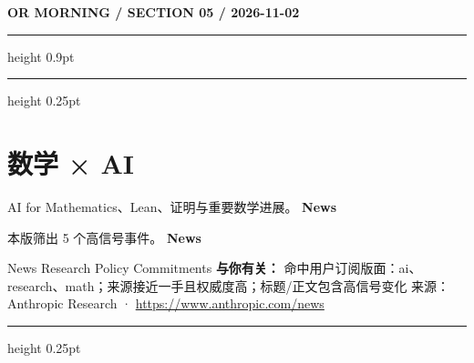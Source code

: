 \documentclass[10.5pt]{ctexart}
\begin{document}
\newpage
{\small\bfseries OR MORNING / SECTION 05 / 2026-11-02}
\vspace{2mm}
\hrule height 0.9pt
\vspace{1.5mm}
\hrule height 0.25pt
\vspace{4mm}
\section*{数学 × AI}
{\color{ormuted} AI for Mathematics、Lean、证明与重要数学进展。}
\vspace{2mm}
{\LARGE\bfseries News}\par
\vspace{1mm}
{\color{ormuted} 本版筛出 5 个高信号事件。}
\vspace{3mm}
{\Large\bfseries News}\par
News Research Policy Commitments
\textbf{与你有关：} 命中用户订阅版面：ai、research、math；来源接近一手且权威度高；标题/正文包含高信号变化
{\footnotesize\color{ormuted} 来源：Anthropic Research · \url{https://www.anthropic.com/news}}
\vspace{4mm}
\hrule height 0.25pt
\vspace{3mm}
\end{document}
